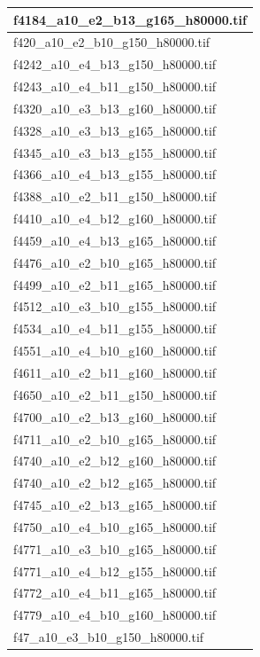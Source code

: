 \documentclass[12pt, twoside]{article}
\begin{document}
\begin{appendices}
\begin{longtable}{|l|}
		f4184\_a10\_e2\_b13\_g165\_h80000.tif \\ \hline 
		f420\_a10\_e2\_b10\_g150\_h80000.tif \\ \hline 
		f4242\_a10\_e4\_b13\_g150\_h80000.tif \\ \hline 
		f4243\_a10\_e4\_b11\_g150\_h80000.tif \\ \hline 
		f4320\_a10\_e3\_b13\_g160\_h80000.tif \\ \hline 
		f4328\_a10\_e3\_b13\_g165\_h80000.tif \\ \hline 
		f4345\_a10\_e3\_b13\_g155\_h80000.tif \\ \hline 
		f4366\_a10\_e4\_b13\_g155\_h80000.tif \\ \hline 
		f4388\_a10\_e2\_b11\_g150\_h80000.tif \\ \hline 
		f4410\_a10\_e4\_b12\_g160\_h80000.tif \\ \hline 
		f4459\_a10\_e4\_b13\_g165\_h80000.tif \\ \hline 
		f4476\_a10\_e2\_b10\_g165\_h80000.tif \\ \hline 
		f4499\_a10\_e2\_b11\_g165\_h80000.tif \\ \hline 
		f4512\_a10\_e3\_b10\_g155\_h80000.tif \\ \hline 
		f4534\_a10\_e4\_b11\_g155\_h80000.tif \\ \hline 
		f4551\_a10\_e4\_b10\_g160\_h80000.tif \\ \hline 
		f4611\_a10\_e2\_b11\_g160\_h80000.tif \\ \hline 
		f4650\_a10\_e2\_b11\_g150\_h80000.tif \\ \hline 
		f4700\_a10\_e2\_b13\_g160\_h80000.tif \\ \hline 
		f4711\_a10\_e2\_b10\_g165\_h80000.tif \\ \hline 
		f4740\_a10\_e2\_b12\_g160\_h80000.tif \\ \hline 
		f4740\_a10\_e2\_b12\_g165\_h80000.tif \\ \hline 
		f4745\_a10\_e2\_b13\_g165\_h80000.tif \\ \hline 
		f4750\_a10\_e4\_b10\_g165\_h80000.tif \\ \hline 
		f4771\_a10\_e3\_b10\_g165\_h80000.tif \\ \hline 
		f4771\_a10\_e4\_b12\_g155\_h80000.tif \\ \hline 
		f4772\_a10\_e4\_b11\_g165\_h80000.tif \\ \hline 
		f4779\_a10\_e4\_b10\_g160\_h80000.tif \\ \hline 
		f47\_a10\_e3\_b10\_g150\_h80000.tif \\ \hline 

\end{longtable}
\end{appendices}
\end{document}
